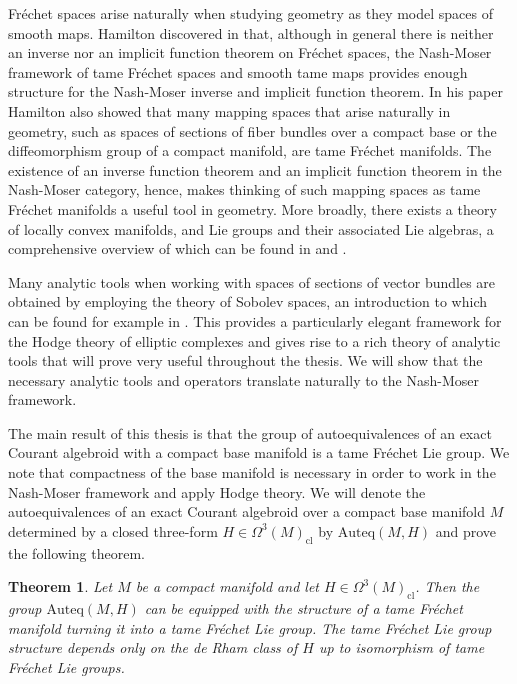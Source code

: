\documentclass[12pt,a4paper]{article}
\theoremstyle{plain}
\newtheorem{theorem}{Theorem}[subsection]
\theoremstyle{definition}
\newcommand{\Forms}[1]{\Omega^{#1}(M)}
\newcommand{\ClForms}[1]{\Forms{#1}_{\mathrm{cl}}}
\newcommand{\Auteq}{\mathrm{Auteq}(M,H)}
\begin{document}
Fréchet spaces arise naturally when studying geometry as they model spaces of smooth maps.  Hamilton discovered in \cite{hamilton} that, although in general there is neither an inverse nor an implicit function theorem on Fréchet spaces, the Nash-Moser framework of tame Fréchet spaces and smooth tame maps provides enough structure for the Nash-Moser inverse and implicit function theorem. In his paper Hamilton also showed that many mapping spaces that arise naturally in geometry, such as spaces of sections of fiber bundles over a compact base or the diffeomorphism group of a compact manifold, are tame Fréchet manifolds. The existence of an inverse function theorem and an implicit function theorem in the Nash-Moser category, hence, makes thinking of such mapping spaces as tame Fréchet manifolds a useful tool in geometry. 
More broadly, there exists a theory of locally convex manifolds, and Lie groups and their associated Lie algebras, a comprehensive overview of which can be found in \cite{InfDimLieneeb} and \cite{schmeding_2022}.

Many analytic tools when working with spaces of sections of vector bundles are obtained by employing the theory of Sobolev spaces, an introduction to which can be found for example in \cite{Wells07}. This provides a particularly elegant framework for the Hodge theory of elliptic complexes and gives rise to a rich theory of analytic tools that will prove very useful throughout the thesis. We will show that the necessary analytic tools and operators translate naturally to the Nash-Moser framework.

The main result of this thesis is that the group of autoequivalences of an exact Courant algebroid with a compact base manifold is a tame Fréchet Lie group. We note that compactness of the base manifold is necessary in order to work in the Nash-Moser framework and apply Hodge theory. We will denote the autoequivalences of an exact Courant algebroid over a compact base manifold $M$ determined by a closed three-form $H\in \ClForms{3}$ by $\Auteq$ and prove the following theorem.

\begin{theorem}
\label{MainThm:AuteqMfdAndLieGr}
Let $M$ be a compact manifold and let $H\in \ClForms{3}$. Then the group $\Auteq$ can be equipped with the structure of a tame Fréchet manifold turning it into a tame Fréchet Lie group.
The tame Fréchet Lie group structure depends only on the de Rham class of $H$ up to isomorphism of tame Fréchet Lie groups.
\end{theorem}
\end{document}
